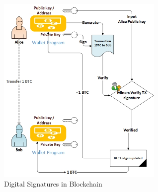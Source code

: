 \begin{figure}[h]
	\centering
    \includegraphics[width=80mm,scale=1]{figs/sig}
	\caption{Digital Signatures in Blockchain}
	\label{fig:bc-sig}
\end{figure}
\clearpage

